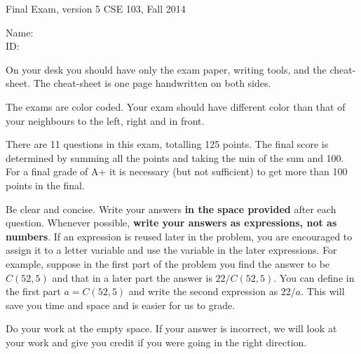\documentclass[10pt,dvips]{amsart}
\begin{document}
\voffset=-0.8in
\newpage
{\textbf \Large Final Exam, version 5} \hfill CSE 103, Fall 2014
\\

\vspace{.25in}

Name: \underline{\hspace{3in}}
\\

ID: \underline{\hspace{3.2in}}
\\

\vspace{0.5in}

On your desk you should have only the exam paper, writing tools, and
the cheat-sheet. The cheat-sheet is one page handwritten on both sides.

The exams are color coded. Your exam should have different color 
than that of your neighbours to the left, right and in front.

There are 11 questions in this exam, totalling 125 points.  The final
score is determined by summing all the points and taking the min of
the sum and 100. For a final grade of A+ it is necessary (but not
sufficient) to get more than 100 points in the final. 

Be clear and concise. Write your answers {\bf in the space provided}
after each question. Whenever possible, {\bf write your answers
as expressions, not as numbers}. If an expression is reused
later in the problem, you are encouraged to assign it to a letter
variable and use the variable in the later expressions. For example,
suppose in the first part of the problem you find the answer to be
$C(52,5)$ and that in a later part the answer is $22/C(52,5)$. You can
define in the first part $a=C(52,5)$ and write the second expression
as $22/a$. This will save you time and space and is easier for us to
grade.

Do your work at the empty space. If your answer is incorrect, we will
look at your work and give you credit if you were going in the right direction.

\vspace{0.2in}
\end{document}
